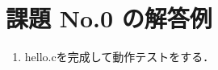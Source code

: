 \documentclass[a4j,twcolumn,11pt,nomag]{ltjarticle}      %
\begin{document}
\onecolumn

\section*{課題 No.0 の解答例}
\begin{enumerate}
\item hello.cを完成して動作テストをする．
\end{enumerate}

\end{document}
